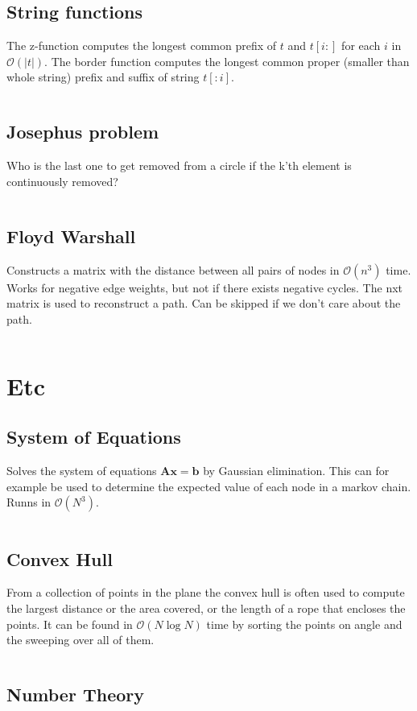 \documentclass[8pt,a4paper,landscape,oneside]{amsart}
\newcommand{\codep}[1]{\inputminted[fontsize=\large,tabsize=2,baselinestretch=1]{py}{code/#1}}
\newcommand{\bigO}{\mathcal{O}}
\begin{document}
\begin{multicols*}{2}
\begin{large}
    \subsection{String functions}
        The z-function computes the longest common prefix of $t$ and $t[i:]$ for each $i$ in $\bigO(|t|)$.
        The border function computes the longest common proper (smaller than whole string) prefix and suffix of string $t[:i]$.
        \codep{DP/strings.py}
    \subsection{Josephus problem}
        Who is the last one to get removed from a circle if the k'th element is continuously removed?
        \codep{DP/josephus.py}
    \subsection{Floyd Warshall}
        Constructs a matrix with the distance between all pairs of nodes in $\bigO(n^3)$ time.
        Works for negative edge weights, but not if there exists negative cycles.
        The nxt matrix is used to reconstruct a path. Can be skipped if we don't care about the path.
        \codep{DP/floydwarshall.py}

\section{Etc}
    \subsection{System of Equations}
        Solves the system of equations $\bm{A}\bm{x} = \bm{b}$ by Gaussian elimination. This can for example be used to determine the expected value of each node in a markov chain. Runns in $\bigO (N^3)$.
        \codep{Etc/gauss.py}
    \subsection{Convex Hull}
        From a collection of points in the plane the convex hull is often used to compute the largest distance or the area covered, or the length of a rope that encloses the points. It can be found in $\bigO (N\log{N})$ time by sorting the points on angle and the sweeping over all of them.
        \codep{Etc/convexhull.py}
    \subsection{Number Theory}
        \codep{Etc/numbertheory.py}

\end{large}
\end{multicols*}
\end{document}
